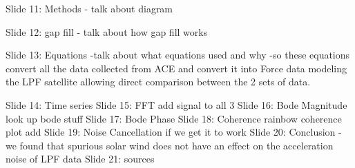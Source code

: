     Slide 11: Methods
        - talk about diagram
    
    Slide 12: gap fill
        - talk about how gap fill works
    
    Slide 13: Equations
        -talk about what equations used and why
        -so these equations convert all the data collected from ACE and convert it into Force data modeling the LPF satellite allowing direct comparison between the 2 sets of data.
        
    
    Slide 14: Time series
    Slide 15: FFT
    add signal to all 3
    Slide 16: Bode Magnitude
    look up bode stuff
    Slide 17: Bode Phase
    Slide 18: Coherence
    rainbow coherence plot add
    Slide 19: Noise Cancellation if we get it to work
    Slide 20: Conclusion
        - we found that spurious solar wind does not have an effect on the acceleration noise of LPF data
    Slide 21: sources
    
    